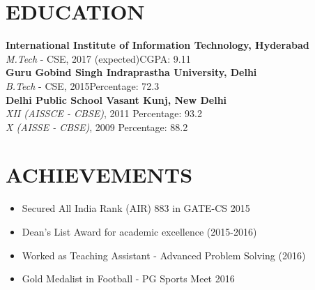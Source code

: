 \documentclass[2pt]{res}
\begin{document}


\address{+91-9910488899}
\address{ayush.k@students.iiit.ac.in}


\begin{resume}

\section{EDUCATION}

\textbf{International Institute of Information Technology, Hyderabad}\\
{\sl M.Tech} - CSE, 2017 (expected)\hfill CGPA: 9.11\\
\textbf{Guru Gobind Singh Indraprastha University, Delhi}\\
{\sl B.Tech} - CSE, 2015\hfill Percentage: 
72.3
\\
\textbf{Delhi Public School Vasant Kunj, New Delhi}\\
{\sl XII (AISSCE - CBSE)}, 2011\hfill 
Percentage: 93.2
\\
{\sl X (AISSE - CBSE)}, 2009\hfill 
Percentage: 88.2

\section{ACHIEVEMENTS}
\par

\begin{itemize}[leftmargin=*]
\item Secured All India Rank (AIR) 883 in GATE-CS 2015
\item Dean's List Award for academic excellence (2015-2016)
\item Worked as Teaching Assistant - Advanced Problem Solving (2016)
\item Gold Medalist in Football - PG Sports Meet 2016
\end{itemize}

\end{resume}
\end{document}
